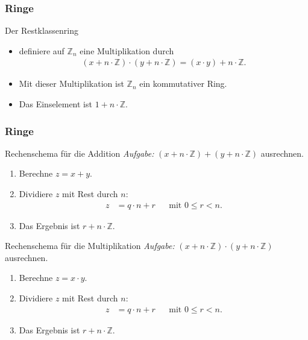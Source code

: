\documentclass{beamer}
\renewcommand{\emph}[1]{{\textcolor{solarizedRed}{\itshape #1}}}
\newcommand\ZZ{\mathbb Z}
\newcommand{\ue}{\"u}
\begin{document}
\begin{frame}\frametitle{Ringe}
	\begin{block}{Der Restklassenring}
		\begin{itemize}
			\item definiere auf $\ZZ_n$ eine Multiplikation durch
				\begin{align*}
					(x+n\cdot\ZZ)\cdot(y+n\cdot\ZZ)=(x\cdot y)+n\cdot\ZZ.
				\end{align*}
			\item Mit dieser Multiplikation ist $\ZZ_n$ ein kommutativer Ring.
			\item Das Einselement ist $1+n\cdot\ZZ$.
		\end{itemize}
	\end{block}
\end{frame}

\begin{frame}\frametitle{Ringe}
	\begin{overprint}
		\begin{block}{Rechenschema f\ue r die Addition}
			\emph{Aufgabe:} $(x+n\cdot\ZZ)+(y+n\cdot\ZZ)$ ausrechnen.
			\begin{enumerate}
				\item Berechne $z=x+y$.
				\item Dividiere $z$ mit Rest durch $n$:
					\begin{align*}
						z&=q\cdot n+r&&\mbox{mit }0\leq r<n.
					\end{align*}
				\item Das Ergebnis ist $r+n\cdot\ZZ$.
			\end{enumerate}
		\end{block}
		\begin{block}{Rechenschema f\ue r die Multiplikation}
			\emph{Aufgabe:} $(x+n\cdot\ZZ)\cdot(y+n\cdot\ZZ)$ ausrechnen.
			\begin{enumerate}
				\item Berechne $z=x\cdot y$.
				\item Dividiere $z$ mit Rest durch $n$:
					\begin{align*}
						z&=q\cdot n+r&&\mbox{mit }0\leq r<n.
					\end{align*}
				\item Das Ergebnis ist $r+n\cdot\ZZ$.
			\end{enumerate}
		\end{block}
	\end{overprint}
\end{frame}
\end{document}
